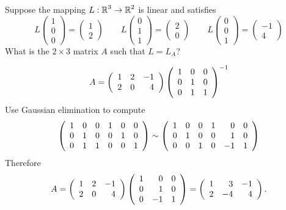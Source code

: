 \documentclass{ximera}
\author{Matthew Carr}
\begin{document}

\begin{exercise}\label{mc8_3A}

Suppose the mapping $L:\mbox{$\Bbb{R}$}^3\to\mbox{$\Bbb{R}$}^2$ is linear and satisfies
\[
L \left(\begin{array}{c} 1 \\ 0 \\0 \end{array}\right) = \left(\begin{array}{c} 1 \\ 2  \end{array}\right) \qquad
L \left(\begin{array}{c} 0 \\ 1\\ 1 \end{array}\right) = \left(\begin{array}{c} 2 \\ 0 \end{array}\right) \qquad
L\left(\begin{array}{c} 0 \\ 0 \\ 1 \end{array}\right) = \left(\begin{array}{r} -1 \\ 4 \end{array}\right)
\]
What is the  $2\times 3$ matrix $A$ such that $L = L_A$?
  
\begin{solution}


\soln \[
A = \left(\begin{array}{rrrrrrrrrrrrrrrrrr} 1 & 2 & -1\\ 2 & 0 & 4 \end{array}\right) \left(\begin{array}{rrrrrrrrrrrrrrrrrr} 1 & 0 & 0 \\ 0 & 1 & 0 \\ 0 & 1 & 1 \end{array}\right)^{-1}
\]
Use Gaussian elimination to compute 
\[
\left(\begin{array}{rrrrrrrrrrrrrrrrrr} 1 & 0 & 0 & 1 & 0 & 0\\ 0 & 1 & 0 & 0 & 1 & 0\\ 0 & 1 & 1 & 0 & 0 & 1 \end{array}\right)\sim
\left(\begin{array}{rrrrrrrrrrrrrrrrrr} 1 & 0 & 0 & 1 & 0 & 0\\ 0 & 1 & 0 & 0 & 1 & 0\\ 0 & 0 & 1 & 0 & -1 & 1 \end{array}\right)
\]
Therefore
\[
A = \left(\begin{array}{rrrrrrrrrrrrrrrrrr} 1 & 2 & -1\\ 2 & 0 & 4 \end{array}\right) \left(\begin{array}{rrrrrrrrrrrrrrrrrr}  1 & 0 & 0\\   0 & 1 & 0\\  0 & -1 & 1 \end{array}\right) = 
 \left(\begin{array}{rrrrrrrrrrrrrrrrrr} 1 & 3 & -1\\ 2 & -4 & 4 \end{array}\right)\ldotp
\]
\end{solution}
\end{exercise}
\end{document}
